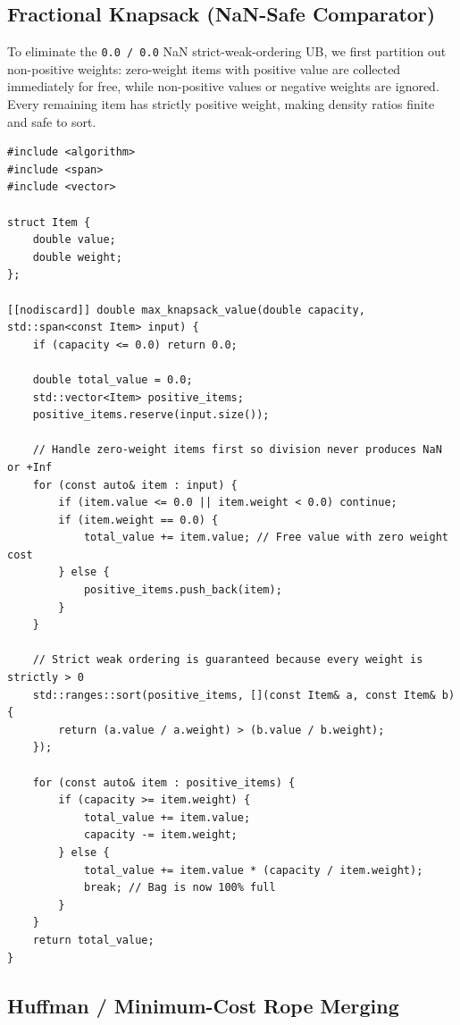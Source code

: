 \documentclass[11pt,a4paper]{article}
\theoremstyle{definition}
\begin{document}
\subsection{Fractional Knapsack (NaN-Safe Comparator)}

To eliminate the \texttt{0.0 / 0.0} NaN strict-weak-ordering UB, we first partition out non-positive weights: zero-weight items with positive value are collected immediately for free, while non-positive values or negative weights are ignored. Every remaining item has strictly positive weight, making density ratios finite and safe to sort.

\begin{lstlisting}[caption={NaN-safe Fractional Knapsack in $O(N \log N)$ time}]
#include <algorithm>
#include <span>
#include <vector>

struct Item {
    double value;
    double weight;
};

[[nodiscard]] double max_knapsack_value(double capacity, std::span<const Item> input) {
    if (capacity <= 0.0) return 0.0;

    double total_value = 0.0;
    std::vector<Item> positive_items;
    positive_items.reserve(input.size());

    // Handle zero-weight items first so division never produces NaN or +Inf
    for (const auto& item : input) {
        if (item.value <= 0.0 || item.weight < 0.0) continue;
        if (item.weight == 0.0) {
            total_value += item.value; // Free value with zero weight cost
        } else {
            positive_items.push_back(item);
        }
    }

    // Strict weak ordering is guaranteed because every weight is strictly > 0
    std::ranges::sort(positive_items, [](const Item& a, const Item& b) {
        return (a.value / a.weight) > (b.value / b.weight);
    });

    for (const auto& item : positive_items) {
        if (capacity >= item.weight) {
            total_value += item.value;
            capacity -= item.weight;
        } else {
            total_value += item.value * (capacity / item.weight);
            break; // Bag is now 100% full
        }
    }
    return total_value;
}
\end{lstlisting}

\subsection{Huffman / Minimum-Cost Rope Merging}
\end{document}
